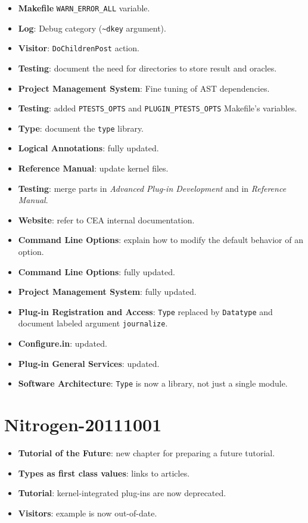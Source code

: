 \begin{itemize}
\item \textbf{Makefile} \texttt{WARN\_ERROR\_ALL} variable.
\item \textbf{Log}: Debug category (\texttt{\~{}dkey} argument).
\item \textbf{Visitor}: \texttt{DoChildrenPost} action.
\item \textbf{Testing}: document the need for directories 
  to store result and oracles.
\item \textbf{Project Management System}: Fine tuning of AST dependencies.
\item \textbf{Testing}: added \texttt{PTESTS\_OPTS} and 
  \texttt{PLUGIN\_PTESTS\_OPTS} Makefile's variables.
\item \textbf{Type}: document the \texttt{type} library.
\item \textbf{Logical Annotations}: fully updated.
\item \textbf{Reference Manual}: update kernel files.
\item \textbf{Testing}: merge parts in \emph{Advanced Plug-in Development} and
  in \emph{Reference Manual}.
\item \textbf{Website}: refer to CEA internal documentation.
\item \textbf{Command Line Options}: explain how to modify the default behavior
  of an option. 
\item \textbf{Command Line Options}: fully updated.
\item \textbf{Project Management System}: fully updated.
\item \textbf{Plug-in Registration and Access}: \texttt{Type} replaced by
  \texttt{Datatype} and document labeled argument \texttt{journalize}.
\item \textbf{Configure.in}: updated.
\item \textbf{Plug-in General Services}: updated.
\item \textbf{Software Architecture}: \texttt{Type} is now a library, not just a
  single module.
\end{itemize}

\section*{Nitrogen-20111001}

\begin{itemize}
\item \textbf{Tutorial of the Future}: new chapter for preparing a future 
  tutorial.
\item \textbf{Types as first class values}: links to articles.
\item \textbf{Tutorial}: kernel-integrated plug-ins are now deprecated.
\item \textbf{Visitors}: example is now out-of-date.
\end{itemize}

